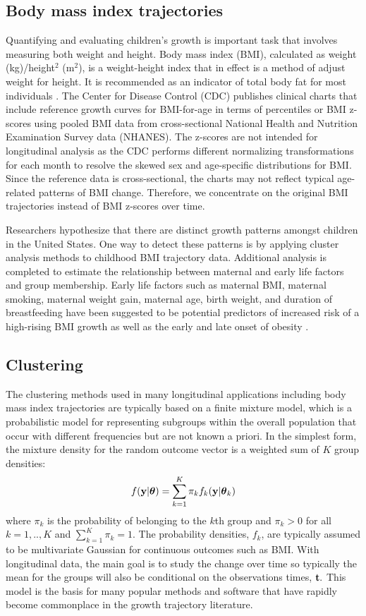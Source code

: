 \subsection{Body mass index trajectories}
Quantifying and evaluating children's growth is important task that involves measuring both weight and height. Body mass index (BMI), calculated as weight (kg)/height$^{2}$ (m$^{2}$), is a weight-height index that in effect is a method of adjust weight for height. It is recommended as an indicator of total body fat for most individuals \cite{roche1981}. The Center for Disease Control (CDC) publishes clinical charts that include reference growth curves for BMI-for-age in terms of percentiles or BMI z-scores using pooled BMI data from cross-sectional National Health and Nutrition Examination Survey data (NHANES). The z-scores are not intended for longitudinal analysis as the CDC performs different normalizing transformations for each month to resolve the skewed sex and age-specific distributions for BMI. Since the reference data is cross-sectional, the charts may not reflect typical age-related patterns of BMI change. Therefore, we concentrate on the original BMI trajectories instead of BMI z-scores over time.

Researchers hypothesize that there are distinct growth patterns amongst children in the United States. One way to detect these patterns is by applying cluster analysis methods to childhood BMI trajectory data. Additional analysis is completed to estimate the relationship between maternal and early life factors and group membership. Early life factors such as maternal BMI, maternal smoking, maternal weight gain, maternal age, birth weight, and duration of breastfeeding have been suggested to be potential predictors of increased risk of a high-rising BMI growth as well as the early and late onset of obesity \cite{pryor2011,carter2012,li2007}.

\subsection{Clustering}
The clustering methods used in many longitudinal applications including body mass index trajectories are typically based on a finite mixture model, which is a probabilistic model for representing subgroups within the overall population that occur with different frequencies but are not known a priori. In the simplest form, the mixture density for the random outcome vector is a weighted sum of $K$ group densities:
$$f(\mathbf y|\boldsymbol\theta) = \sum^{K}_{k=1}\pi_{k}f_{k}(\mathbf y|\boldsymbol\theta_{k})$$
where $\pi_{k}$ is the probability of belonging to the $k$th group and $\pi_{k}>0$ for all $k=1,..,K$ and $\sum^{K}_{k=1}\pi_{k}=1$. The probability densities, $f_{k}$, are typically assumed to be multivariate Gaussian for continuous outcomes such as BMI. With longitudinal data, the main goal is to study the change over time so typically the mean for the groups will also be conditional on the observations times, $\mathbf t.$  This model is the basis for many popular methods and software that have rapidly become commonplace in the growth trajectory literature.

